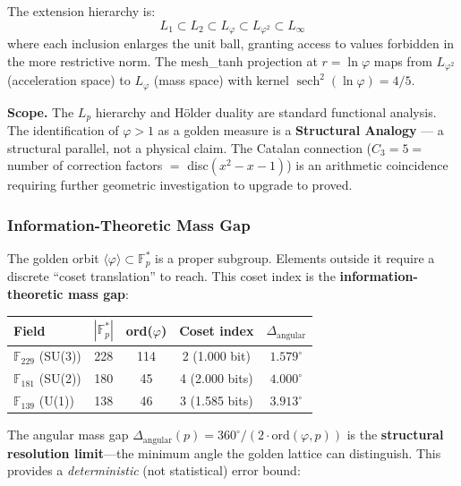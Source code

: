 The extension hierarchy is:
\begin{equation}
    L_1 \subset L_2 \subset L_\varphi \subset L_{\varphi^2} \subset L_\infty
\end{equation}
where each inclusion enlarges the unit ball, granting access to values forbidden in the more restrictive norm. The mesh\_tanh projection at $r = \ln\varphi$ maps from $L_{\varphi^2}$ (acceleration space) to $L_\varphi$ (mass space) with kernel $\operatorname{sech}^2(\ln\varphi) = 4/5$.

\textbf{Scope.} The $L_p$ hierarchy and H\"older duality are standard functional analysis. The identification of $\varphi > 1$ as a golden measure is a \textbf{Structural Analogy} --- a structural parallel, not a physical claim. The Catalan connection ($C_3 = 5 =$ number of correction factors $=$ disc$(x^2 - x - 1)$) is an arithmetic coincidence requiring further geometric investigation to upgrade to proved.

\subsubsection{Information-Theoretic Mass Gap}
\label{sec:info_mass_gap}

The golden orbit $\langle\varphi\rangle \subset \mathbb{F}_p^*$ is a proper subgroup. Elements outside it require a discrete ``coset translation'' to reach. This coset index is the \textbf{information-theoretic mass gap}:

\begin{center}
\renewcommand{\arraystretch}{1.2}
\begin{tabular}{@{}lcccc@{}}
\toprule
\textbf{Field} & \textbf{$|\mathbb{F}_p^*|$} & \textbf{ord($\varphi$)} & \textbf{Coset index} & \textbf{$\Delta_{\text{angular}}$} \\
\midrule
$\mathbb{F}_{229}$ (SU(3)) & 228 & 114 & 2 (1.000 bit) & $1.579^\circ$ \\
$\mathbb{F}_{181}$ (SU(2)) & 180 & 45 & 4 (2.000 bits) & $4.000^\circ$ \\
$\mathbb{F}_{139}$ (U(1)) & 138 & 46 & 3 (1.585 bits) & $3.913^\circ$ \\
\bottomrule
\end{tabular}
\end{center}

The angular mass gap $\Delta_{\text{angular}}(p) = 360^\circ / (2 \cdot \text{ord}(\varphi, p))$ is the \textbf{structural resolution limit}---the minimum angle the golden lattice can distinguish. This provides a \emph{deterministic} (not statistical) error bound:

